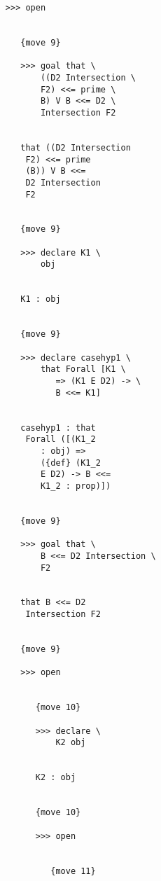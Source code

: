 \documentclass[12pt]{article}
\begin{document}
\begin{verbatim}
                        >>> open


                           {move 9}

                           >>> goal that \
                               ((D2 Intersection \
                               F2) <<= prime \
                               B) V B <<= D2 \
                               Intersection F2


                           that ((D2 Intersection 
                            F2) <<= prime 
                            (B)) V B <<= 
                            D2 Intersection 
                            F2


                           {move 9}

                           >>> declare K1 \
                               obj


                           K1 : obj


                           {move 9}

                           >>> declare casehyp1 \
                               that Forall [K1 \
                                  => (K1 E D2) -> \
                                  B <<= K1]


                           casehyp1 : that 
                            Forall ([(K1_2 
                               : obj) => 
                               ({def} (K1_2 
                               E D2) -> B <<= 
                               K1_2 : prop)])


                           {move 9}

                           >>> goal that \
                               B <<= D2 Intersection \
                               F2


                           that B <<= D2 
                            Intersection F2


                           {move 9}

                           >>> open


                              {move 10}

                              >>> declare \
                                  K2 obj


                              K2 : obj


                              {move 10}

                              >>> open


                                 {move 11}


\end{verbatim}
\end{document}

